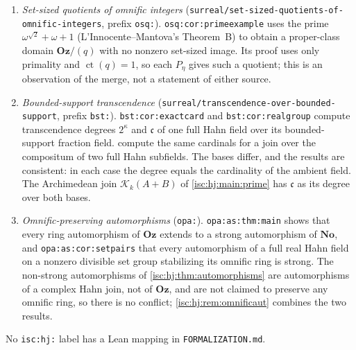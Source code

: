 \documentclass[11pt,letterpaper]{article}
\theoremstyle{definition}
\theoremstyle{remark}
\newcommand{\No}{\mathbf{No}}
\newcommand{\Oz}{\mathbf{Oz}}
\newcommand{\K}[2]{\mathcal K_{#1}(#2)}
\newcommand{\ct}{\operatorname{ct}}
\newcommand{\rpath}[1]{\nolinkurl{#1}}%
\newcommand{\lbl}[1]{\nolinkurl{#1}}%
\newcommand{\cc}{\mathfrak c}
\numberwithin{equation}{section}
\begin{document}
\begin{enumerate}[leftmargin=*,itemsep=3pt]
Biljakovic--Kochetov--Kuhlmann; as reviewed in \cite[Section~1.3]{LM}).
 is the same one-row input with the
constant-term pullback written out, and the $P_\eta$ are a new explicit
continuum subfamily of such primes. A search of the collection found no
other nonconstant prime element of $\Oz[i]$ (the set-sized-quotients report
treats the ideals generated by ordinary Gaussian primes such as $1+i$), so
primality of the $P_\eta$ in $\Oz[i]$ appears here first in the collection;
this is not a priority claim. Every $P_\eta$ has constant term $1$,
as \lbl{odg:prop:irreduciblect} requires of a nonconstant irreducible.
\item \emph{Set-sized quotients of omnific integers}
(\rpath{surreal/set-sized-quotients-of-omnific-integers}, prefix
\texttt{osq:}). \lbl{osq:cor:primeexample} uses the prime
$\omega^{\sqrt2}+\omega+1$ (L'Innocente--Mantova's Theorem~B) to obtain a
proper-class domain $\Oz/(q)$ with no nonzero set-sized image. Its proof
uses only primality and $\ct(q)=1$, so each $P_\eta$ gives such a quotient;
this is an observation of the merge, not a statement of either source.
\item \emph{Bounded-support transcendence}
(\rpath{surreal/transcendence-over-bounded-support}, prefix
\texttt{bst:}). \lbl{bst:cor:exactcard} and \lbl{bst:cor:realgroup} compute
transcendence degrees $2^\kappa$ and $\cc$ of one full Hahn field over its
bounded-support fraction field. 
compute the same cardinals for a join over the compositum of two full
Hahn subfields. The bases differ, and the results are consistent: in each
case the degree equals the cardinality of the ambient field. The
Archimedean join $\K{k}{A+B}$ of \cref{isc:hj:main:prime} has
$\cc$ as its degree over both bases.
\item \emph{Omnific-preserving automorphisms} (\texttt{opa:}).
\lbl{opa:as:thm:main} shows that every ring automorphism of $\Oz$ extends
to a strong automorphism of $\No$, and \lbl{opa:as:cor:setpairs} that every
automorphism of a full real Hahn field on a nonzero divisible set group
stabilizing its omnific ring is strong. The non-strong automorphisms of
\cref{isc:hj:thm:automorphisms} are automorphisms of a complex Hahn join,
not of $\Oz$, and are not claimed to preserve any omnific ring, so there is
no conflict; \cref{isc:hj:rem:omnificaut} combines the two results.
\end{enumerate}
No \texttt{isc:hj:} label has a Lean mapping in \rpath{FORMALIZATION.md}.
\end{document}
